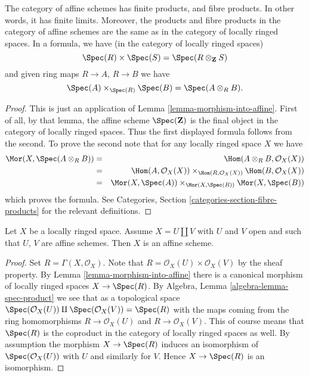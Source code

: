 \begin{lemma}
\label{lemma-fibre-product-affine-schemes}
The category of affine schemes has finite products, and fibre products.
In other words, it has finite limits. Moreover, the products
and fibre products in the category of affine schemes
are the same as in the category of locally ringed spaces.
In a formula, we have (in the category of locally ringed spaces)
$$
\Spec(R) \times \Spec(S) =
\Spec(R \otimes_{\mathbf{Z}} S)
$$
and given ring maps $R \to A$, $R \to B$ we have
$$
\Spec(A) \times_{\Spec(R)} \Spec(B)
=
\Spec(A \otimes_R B).
$$
\end{lemma}

\begin{proof}
This is just an application of Lemma \ref{lemma-morphism-into-affine}.
First of all, by that lemma, the affine scheme
$\Spec(\mathbf{Z})$ is the final object in the category
of locally ringed spaces. Thus the first displayed formula
follows from the second. To prove the second note that
for any locally ringed space $X$ we have
\begin{eqnarray*}
\Mor(X, \Spec(A \otimes_R B))
& = &
\Hom(A \otimes_R B, \mathcal{O}_X(X)) \\
& = &
\Hom(A, \mathcal{O}_X(X))
\times_{\Hom(R, \mathcal{O}_X(X))}
\Hom(B, \mathcal{O}_X(X)) \\
& = &
\Mor(X, \Spec(A))
\times_{\Mor(X, \Spec(R))}
\Mor(X, \Spec(B))
\end{eqnarray*}
which proves the formula.
See Categories, Section \ref{categories-section-fibre-products} for the
relevant definitions.
\end{proof}

\begin{lemma}
\label{lemma-disjoint-union-affines}
Let $X$ be a locally ringed space.
Assume $X = U \amalg V$ with $U$ and $V$ open and
such that $U$, $V$ are affine schemes. Then $X$ is an affine scheme.
\end{lemma}

\begin{proof}
Set $R = \Gamma(X, \mathcal{O}_X)$.
Note that $R = \mathcal{O}_X(U) \times \mathcal{O}_X(V)$
by the sheaf property. By Lemma \ref{lemma-morphism-into-affine}
there is a canonical morphism of locally ringed spaces
$X \to \Spec(R)$. By Algebra, Lemma \ref{algebra-lemma-spec-product}
we see that as a topological space
$\Spec(\mathcal{O}_X(U)) \amalg \Spec(\mathcal{O}_X(V)) =
\Spec(R)$
with the maps coming from the ring homomorphisms
$R \to \mathcal{O}_X(U)$ and $R \to \mathcal{O}_X(V)$.
This of course means that $\Spec(R)$ is the coproduct
in the category of locally ringed spaces as well.
By assumption the morphism $X \to \Spec(R)$ induces an isomorphism
of $\Spec(\mathcal{O}_X(U))$ with $U$ and similarly
for $V$. Hence $X \to \Spec(R)$ is an isomorphism.
\end{proof}















